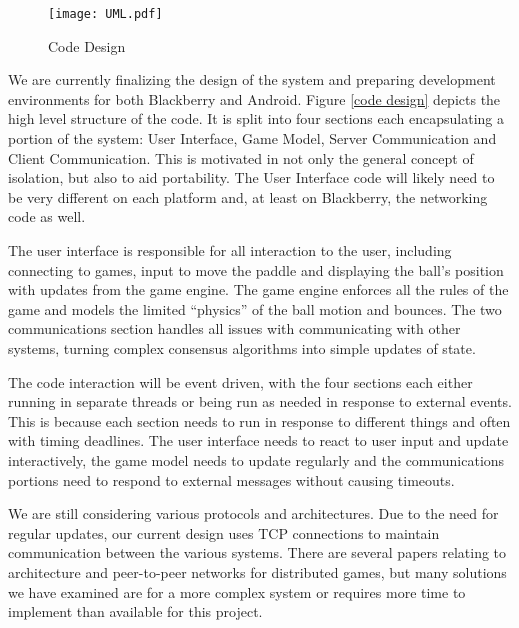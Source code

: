 \documentclass{sig-alternate}
\begin{document}

\begin{figure}[htb]
	\label{code design}
	\begin{center}
		\texttt{[image: UML.pdf]}
		\caption{Code Design}
	\end{center}
\end{figure}

We are currently finalizing the design of the system and preparing
development environments for both Blackberry and Android.  Figure \ref{code
design} depicts the high level structure of the code.  It is split into
four sections each encapsulating a portion of the system: User Interface,
Game Model, Server Communication and Client Communication.  This is
motivated in not only the general concept of isolation, but also to aid
portability.  The User Interface code will likely need to be very different
on each platform and, at least on Blackberry, the networking code as well.

The user interface is responsible for all interaction to the user,
including connecting to games, input to move the paddle and displaying the
ball's position with updates from the game engine.  The game engine
enforces all the rules of the game and models the limited ``physics'' of
the ball motion and bounces.  The two communications section handles all
issues with communicating with other systems, turning complex consensus
algorithms into simple updates of state.

The code interaction will be event driven, with the four sections each
either running in separate threads or being run as needed in response to
external events.  This is because each section needs to run in response to
different things and often with timing deadlines.  The user interface needs
to react to user input and update interactively, the game model needs to
update regularly and the communications portions need to respond to
external messages without causing timeouts.

We are still considering various protocols and architectures.  Due to the
need for regular updates, our current design uses TCP connections to
maintain communication between the various systems.  There are several
papers relating to architecture and peer-to-peer networks for distributed
games,\cite{gamepapers} but many solutions we have examined are for a more
complex system or requires more time to implement than available for this
project.



\balance
\end{document}
